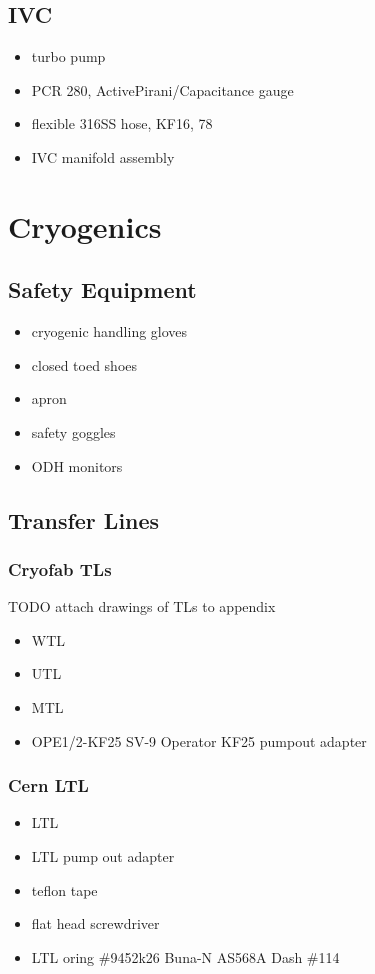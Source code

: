   \subsection{IVC}
\begin{itemize}
 \item turbo pump
\item {} PCR 280, ActivePirani/Capacitance gauge
\item {} flexible 316SS hose, KF16, 78\inches
\item IVC manifold assembly
\end{itemize}


\section{Cryogenics}
  \subsection{Safety Equipment}
\begin{itemize}
 \item cryogenic handling gloves
\item closed toed shoes
\item apron
\item safety goggles
\item ODH monitors
\end{itemize}

  \subsection{Transfer Lines}
\subsubsection{Cryofab TLs}
TODO attach drawings of TLs to appendix
\begin{itemize}
\item WTL
\item UTL
\item MTL
\item {} OPE1/2-KF25 SV-9 Operator KF25 pumpout adapter
\end{itemize}

\subsubsection{Cern LTL}
\begin{itemize}
\item LTL
\item LTL pump out adapter
\item teflon tape
\item flat head screwdriver
\item LTL oring  \#9452k26 Buna-N AS568A Dash \#114
\end{itemize}


